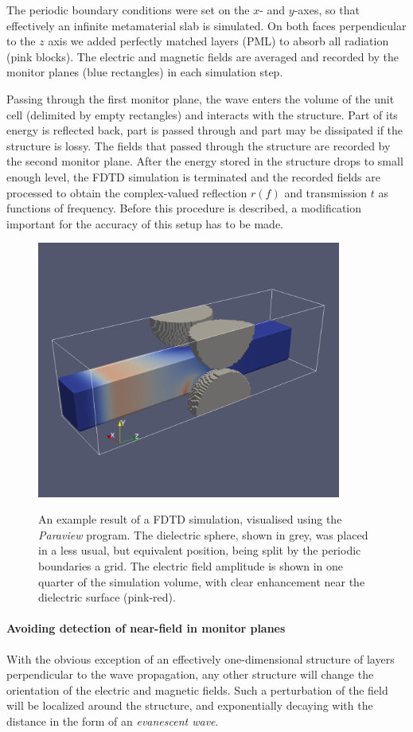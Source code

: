 The periodic boundary conditions were set on the $x$- and $y$-axes, so that effectively an infinite metamaterial slab is simulated. On both faces perpendicular to the $z$ axis we added perfectly matched layers (PML) to absorb all radiation (pink blocks).  The electric and magnetic fields are averaged and recorded by the monitor planes (blue rectangles) in each simulation step. 

Passing through the first monitor plane, the wave enters the volume of the unit cell (delimited by empty rectangles) and interacts with the structure. Part of its energy is reflected back, part is passed through and part may be dissipated if the structure is lossy. The fields that passed through the structure are recorded by the second monitor plane. After the energy stored in the structure drops to small enough level, the FDTD simulation is terminated and the recorded fields are processed to obtain the complex-valued reflection $r(f)$ and transmission $t$ as functions of frequency. Before this procedure is described, a modification important for the accuracy of this setup has to be made.
\begin{figure}[h] \caption{An example result of a FDTD simulation, visualised using the \textit{Paraview} program. The dielectric sphere, shown in grey, was placed in a less usual, but equivalent position, being split by the periodic boundaries a grid. The electric field amplitude is shown in one quarter of the simulation volume, with clear enhancement near the dielectric surface (pink-red).}  \centering \includegraphics[width=10cm]{img/sim_screen.pdf} \label{fg_} \end{figure} 
\paragraph{Avoiding detection of near-field in monitor planes} %
With the obvious exception of an effectively one-dimensional structure of layers perpendicular to the wave propagation, any other structure will change the orientation of the electric and magnetic fields. Such a perturbation of the field will be localized around the structure, and exponentially decaying with the distance in the form of an \textit{evanescent wave}.

